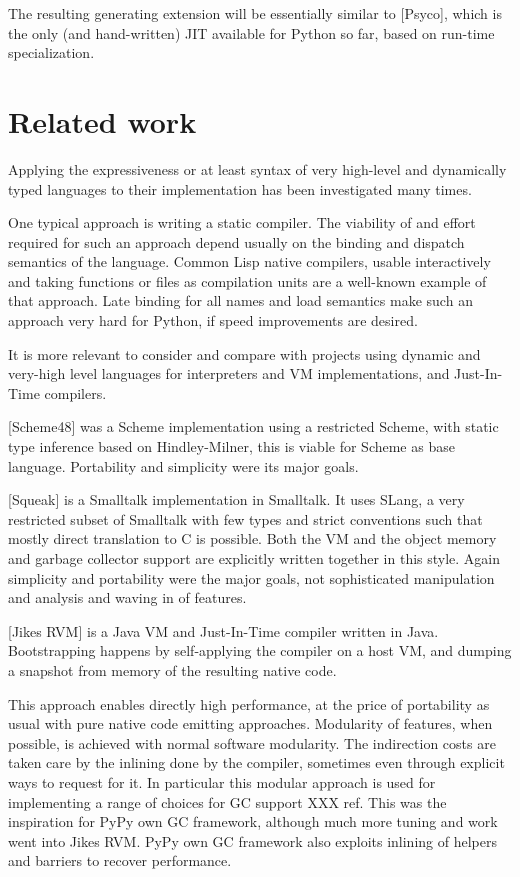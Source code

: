 \documentclass{acm_proc_article-sp}
\begin{document}
The resulting generating extension will be essentially similar to
[Psyco], which is the only (and hand-written) JIT available for Python so
far, based on run-time specialization.



\section{Related work}
\label{relatedwork}

Applying the expressiveness or at least syntax of very high-level and
dynamically typed languages to their implementation has been
investigated many times. 

One typical approach is writing a static compiler.  The viability of
and effort required for such an approach depend usually on the binding
and dispatch semantics of the language.  Common Lisp native compilers,
usable interactively and taking functions or files as compilation
units are a well-known example of that approach.  Late binding for all
names and load semantics make such an approach very hard for Python,
if speed improvements are desired.

It is more relevant to consider and compare with projects using
dynamic and very-high level languages for interpreters and VM
implementations, and Just-In-Time compilers.

[Scheme48] was a Scheme implementation using a restricted Scheme, with
static type inference based on Hindley-Milner, this is viable for
Scheme as base language. Portability and simplicity were its major
goals.

[Squeak] is a Smalltalk implementation in Smalltalk. It uses SLang, a
very restricted subset of Smalltalk with few types and strict
conventions such that mostly direct translation to C is possible.
Both the VM and the object memory and garbage collector support are
explicitly written together in this style. Again simplicity and
portability were the major goals, not sophisticated manipulation and
analysis and waving in of features.

[Jikes RVM] is a Java VM and Just-In-Time compiler written in Java.
Bootstrapping happens by self-applying the compiler on a host VM, and
dumping a snapshot from memory of the resulting native code.

This approach enables directly high performance, at the price of
portability as usual with pure native code emitting
approaches. Modularity of features, when possible, is achieved with
normal software modularity. The indirection costs are taken care by
the inlining done by the compiler, sometimes even through explicit
ways to request for it. In particular this modular approach is used
for implementing a range of choices for GC support XXX ref.  This was
the inspiration for PyPy own GC framework, although much more tuning
and work went into Jikes RVM. PyPy own GC framework also exploits
inlining of helpers and barriers to recover performance.
\end{document}
